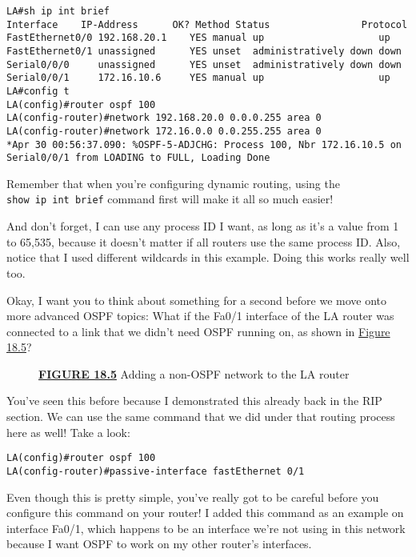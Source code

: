 \begin{verbatim}
LA#sh ip int brief
Interface    IP-Address      OK? Method Status                Protocol
FastEthernet0/0 192.168.20.1    YES manual up                    up
FastEthernet0/1 unassigned      YES unset  administratively down down
Serial0/0/0     unassigned      YES unset  administratively down down
Serial0/0/1     172.16.10.6     YES manual up                    up
LA#config t
LA(config)#router ospf 100
LA(config-router)#network 192.168.20.0 0.0.0.255 area 0
LA(config-router)#network 172.16.0.0 0.0.255.255 area 0
*Apr 30 00:56:37.090: %OSPF-5-ADJCHG: Process 100, Nbr 172.16.10.5 on Serial0/0/1 from LOADING to FULL, Loading Done
\end{verbatim}

Remember that when you're configuring dynamic routing, using the
\texttt{show\ ip\ int\ brief} command first will make it all so much
easier!

And don't forget, I can use any process ID I want, as long as it's a
value from 1 to 65,535, because it doesn't matter if all routers use the
same process ID. Also, notice that I used different wildcards in this
example. Doing this works really well too.

Okay, I want you to think about something for a second before we move
onto more advanced OSPF topics: What if the Fa0/1 interface of the LA
router was connected to a link that we didn't need OSPF running on, as
shown in \protect\hyperlink{c18.xhtmlux5cux23figure18-5}{Figure 18.5}?

\begin{figure}
\centering
\caption{{\protect\hyperlink{c18.xhtmlux5cux23figureanchor18-5}{\textbf{FIGURE
18.5}} Adding a non-OSPF network to the LA router}}
\end{figure}

You've seen this before because I demonstrated this already back in the
RIP section. We can use the same command that we did under that routing
process here as well! Take a look:

\begin{verbatim}
LA(config)#router ospf 100
LA(config-router)#passive-interface fastEthernet 0/1
\end{verbatim}

Even though this is pretty simple, you've really got to be careful
before you configure this command on your router! I added this command
as an example on interface Fa0/1, which happens to be an interface we're
not using in this network because I want OSPF to work on my other
router's interfaces.


